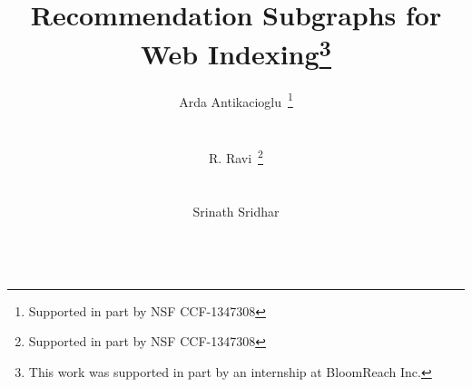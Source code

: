 \documentclass{sig-alternate}
\begin{document}
\sloppy
\title{Recommendation Subgraphs for Web Indexing\thanks{This work was supported in part by an internship at BloomReach Inc.}}

\author{
\alignauthor
Arda Antikacioglu~\thanks{Supported in part by NSF CCF-1347308} \\
       \\
       \\
\alignauthor
R. Ravi~\thanks{Supported in part by NSF CCF-1347308}  \\
       \\
       \\
\alignauthor
Srinath Sridhar \\
       \\
}

\maketitle

\setcounter{page}{1}









\setcounter{page}{1}
{}

\end{document}
